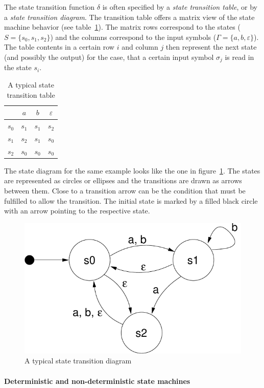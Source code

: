 \documentclass[a4paper,12pt,BCOR6mm,bibtotoc,idxtotoc]{scrbook}
\begin{document}
The state transition function $\delta$ is often specified by a
\textit{state transition table}, or by a \textit{state transition
  diagram}. The transition table offers a matrix view of the state
machine behavior (see table~\ref{tab:statetrans}). The matrix rows
correspond to the states ($S = \{s_0, s_1, s_2\}$) and the columns
correspond to the input symbols ($\Gamma = \{a, b, \varepsilon\}$).
The table contents in a certain row $i$ and column $j$ then represent
the next state (and possibly the output) for the case, that a certain
input symbol $\sigma_j$ is read in the state $s_i$.

\begin{table}[htbp]
  \caption{A typical state transition table}
  \label{tab:statetrans}
  \vspace{2mm}
  \centering
  \begin{tabular}{l|ccc}
    & $a$ & $b$ & $\varepsilon$\\ \hline
    $s_0$ & $s_1$ & $s_1$ & $s_2$\\
    $s_1$ & $s_2$ & $s_1$ & $s_0$\\
    $s_2$ & $s_0$ & $s_0$ & $s_0$\\ \hline
  \end{tabular}
\end{table}

The state diagram for the same example looks like the one in
figure~\ref{fig:statetrans}. The states are represented as circles or
ellipses and the transitions are drawn as arrows between them. Close
to a transition arrow can be the condition that must be fulfilled to
allow the transition. The initial state is marked by a filled black
circle with an arrow pointing to the respective state.

\begin{figure}[htbp]
  \centering
  \includegraphics[width=.5\textwidth]{images/statetrans}
  \caption{A typical state transition diagram}
  \label{fig:statetrans}
\end{figure}

\paragraph{Deterministic and non-deterministic state machines}
\end{document}
